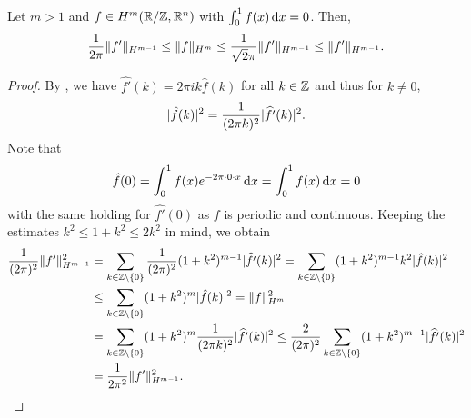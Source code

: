 \begin{lemma}
    \label{lemma:equivalentSobolevNormsDerivative}
    Let $m>1$ and $f \in H^m(\mathbb{R}/\mathbb{Z},\mathbb{R}^n)$ with $\int_0^1 f(x) \,\mathrm{d} x =0$.
    Then,
    \[
        \frac 1 {2\pi} \norm[H^{m-1}]{f'}
        \le \norm[H^m]{f}
        \le \frac 1 {\sqrt{2} \pi} \norm[H^{m-1}]{f'}
        \le \norm[H^{m-1}]{f'}.
    \]
\end{lemma}
\begin{proof}
    By \cite[Proposition~3.1.2~(10)]{Grafakos:2014:ClassicalFourierAnalysis}, we have $\widehat{f'}(k) = 2\pi i k \hat f(k)$ for all $k \in \mathbb{Z}$ and thus for $k \ne 0$,
    \[
        \lvert\hat f(k)\rvert^2 = \frac 1 {(2 \pi k)^2} \lvert\widehat{f'}(k)\rvert^2.
    \]
    Note that
    \[
        \hat f(0) = \int_0^1 f(x)e^{-2\pi \cdot 0 \cdot x} \,\mathrm{d} x =\int_0^1 f(x) \,\mathrm{d} x =0
    \]
    with the same holding for $\widehat{f'}(0)$ as $f$ is periodic and continuous.
    Keeping the estimates $k^2 \le 1+k^2 \le 2 k^2$ in mind, we obtain
    \begin{align*}
        \frac 1 {(2\pi)^2} \norm[H^{m-1}]{f'}^2
        &= \sum_{k\in \Z \setminus \{0\}} \frac 1 {(2\pi)^2} (1+k^2)^{m-1} \abs{\widehat{f'}(k)}^2
        = \sum_{k\in \Z \setminus \{0\}} (1+k^2)^{m-1}  k^2 \abs{\hat f(k)}^2\\
        &\le \sum_{k\in \Z \setminus \{0\}} (1+k^2)^m \abs{\hat f(k)}^2
        = \norm[H^m]{f}^2\\
        &= \sum_{k\in \Z \setminus \{0\}} (1+k^2)^m \frac 1 {(2 \pi k)^2} \abs{\widehat{f'}(k)}^2
        \le \frac 2 {(2\pi)^2}  \sum_{k\in \Z \setminus \{0\}} (1+k^2)^{m-1} \abs{\widehat{f'}(k)}^2\\
        &= \frac 1 {2\pi^2} \norm[H^{m-1}]{f'}^2.
    \end{align*}
\end{proof}
